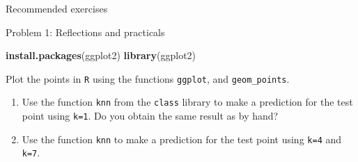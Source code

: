 \documentclass[ignorenonframetext,]{beamer}
\newenvironment{Shaded}{\begin{snugshade}}{\end{snugshade}}
\newcommand{\KeywordTok}[1]{\textcolor[rgb]{0.13,0.29,0.53}{\textbf{#1}}}
\newcommand{\NormalTok}[1]{#1}
\providecommand{\tightlist}{%
  \setlength{\itemsep}{0pt}\setlength{\parskip}{0pt}}
\begin{document}
\begin{frame}[fragile]{Recommended exercises}
\begin{block}{Problem 1: Reflections and practicals}
\begin{Shaded}
\begin{Highlighting}[]
\KeywordTok{install.packages}\NormalTok{(ggplot2)}
\KeywordTok{library}\NormalTok{(ggplot2)}
\end{Highlighting}
\end{Shaded}

Plot the points in \texttt{R} using the functions \texttt{ggplot}, and
\texttt{geom\_points}.

\begin{enumerate}
\def\labelenumi{\alph{enumi}.}
\setcounter{enumi}{5}
\tightlist
\item
  Use the function \texttt{knn} from the \texttt{class} library to make
  a prediction for the test point using \texttt{k=1}. Do you obtain the
  same result as by hand?
\item
  Use the function \texttt{knn} to make a prediction for the test point
  using \texttt{k=4} and \texttt{k=7}.
\end{enumerate}

\end{block}

\end{frame}
\end{document}
